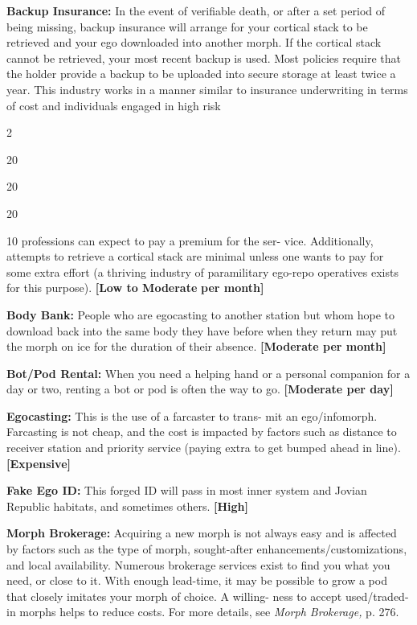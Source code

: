 \textbf{Backup Insurance:} In the event of verifiable 
death, or after a set period of being missing, backup 
insurance will arrange for your cortical stack to be 
retrieved and your ego downloaded into another 
morph. If the cortical stack cannot be retrieved, your 
most recent backup is used. Most policies require 
that the holder provide a backup to be uploaded 
into secure storage at least twice a year. This industry 
works in a manner similar to insurance underwriting 
in terms of cost and individuals engaged in high risk 

2

20

20

20

10
professions can expect to pay a premium for the ser-
vice. Additionally, attempts to retrieve a cortical stack 
are minimal unless one wants to pay for some extra 
effort (a thriving industry of paramilitary ego-repo 
operatives exists for this purpose). \textbf{[Low to Moderate }
\textbf{per month]}

\textbf{Body Bank:} People who are egocasting to another 
station but whom hope to download back into the 
same body they have before when they return may 
put the morph on ice for the duration of their absence. 
\textbf{[Moderate per month]}

\textbf{Bot/Pod Rental:} When you need a helping hand or 
a personal companion for a day or two, renting a bot 
or pod is often the way to go. \textbf{[Moderate per day]}

\textbf{Egocasting:} This is the use of a farcaster to trans-
mit an ego/infomorph. Farcasting is not cheap, and 
the cost is impacted by factors such as distance to 
receiver station and priority service (paying extra to 
get bumped ahead in line). \textbf{[Expensive]}

\textbf{Fake Ego ID:} This forged ID will pass in most inner 
system and Jovian Republic habitats, and sometimes 
others. \textbf{[High]}

\textbf{Morph Brokerage:} Acquiring a new morph is not 
always easy and is affected by factors such as the type 
of morph, sought-after enhancements/customizations, 
and local availability. Numerous brokerage services 
exist to find you what you need, or close to it. With 
enough lead-time, it may be possible to grow a pod 
that closely imitates your morph of choice. A willing-
ness to accept used/traded-in morphs helps to reduce 
costs. For more details, see \textit{Morph Brokerage,} p. 276.

